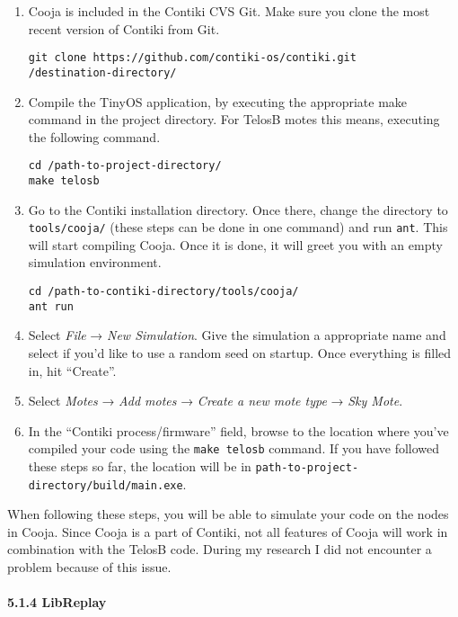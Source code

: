 \begin{enumerate}
\def\labelenumi{\arabic{enumi}.}
\item
  Cooja is included in the Contiki CVS Git. Make sure you clone the most
  recent version of Contiki from Git.

\begin{verbatim}
git clone https://github.com/contiki-os/contiki.git
/destination-directory/
\end{verbatim}
\item
  Compile the TinyOS application, by executing the appropriate make
  command in the project directory. For TelosB motes this means,
  executing the following command.

\begin{verbatim}
cd /path-to-project-directory/
make telosb
\end{verbatim}
\item
  Go to the Contiki installation directory. Once there, change the
  directory to \texttt{tools/cooja/} (these steps can be done in one
  command) and run \texttt{ant}. This will start compiling Cooja. Once
  it is done, it will greet you with an empty simulation environment.

\begin{verbatim}
cd /path-to-contiki-directory/tools/cooja/
ant run
\end{verbatim}
\item
  Select \emph{File} → \emph{New Simulation}. Give the simulation a
  appropriate name and select if you'd like to use a random seed on
  startup. Once everything is filled in, hit ``Create''.
\item
  Select \emph{Motes} → \emph{Add motes} → \emph{Create a new mote type}
  → \emph{Sky Mote}.
\item
  In the ``Contiki process/firmware'' field, browse to the location
  where you've compiled your code using the \texttt{make telosb}
  command. If you have followed these steps so far, the location will be
  in \texttt{path-to-project-directory/build/main.exe}.
\end{enumerate}

When following these steps, you will be able to simulate your code on
the nodes in Cooja. Since Cooja is a part of Contiki, not all features
of Cooja will work in combination with the TelosB code. During my
research I did not encounter a problem because of this issue.

\paragraph{5.1.4 LibReplay\\\\}\label{libreplay}

